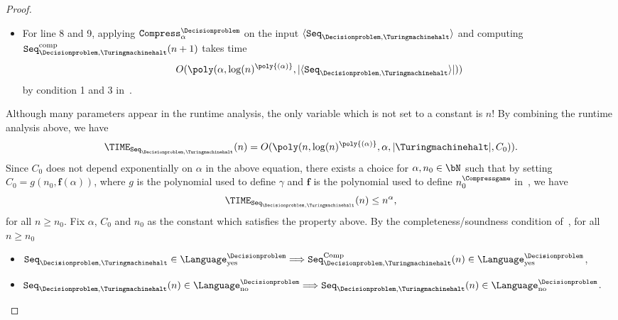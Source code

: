 \begin{proof}
\begin{itemize}
		\begin{equation*}
			O(\poly(|\cG_{C_0}|, C_0 ,n)) = O(\poly(n,C_0, |\text{\Turingmachinehalt}|)).
		\end{equation*} 
		\item For line 8 and 9, applying $\texttt{Compress}_{\alpha}^{\Decisionproblem}$ on the input $\langle \UniformseqREproof \rangle$ and computing $\texttt{Seq}_{\Decisionproblem,\text{\Turingmachinehalt}}^{\text{comp}}(n+1)$ takes time
		\begin{equation*}
			O(\poly(\alpha, \log(n)^{\poly{(\alpha)}}, |\langle \UniformseqREproof \rangle|))
		\end{equation*}
		by condition 1 and 3 in~.
	\end{itemize}
	Although many parameters appear in the runtime analysis, the only variable which is not set to a constant is $n$! By combining the runtime analysis above, we have
	\begin{equation*}
		\TIME_{\UniformseqREproof}(n) = O(\poly(n, \log(n)^{\poly{(\alpha)}}, \alpha, |\text{\Turingmachinehalt}|, C_0 )).
	\end{equation*}
	Since $C_0$ does not depend exponentially on $\alpha$ in the above equation, there exists a choice for $\alpha, n_0 \in \bN$ such that by setting $C_0 = g(n_0, \textbf{f}(\alpha))$, where $g$ is the polynomial used to define $\gamma$ and $\textbf{f}$ is the polynomial used to define $n_0^{\Compressgame}$ in~, we have
	\begin{equation*}
		\TIME_{\UniformseqREproof}(n) \leq n^{\alpha},
	\end{equation*}
	for all $n \geq n_0$. Fix $\alpha$, $C_0$ and $n_0$ as the constant which satisfies the property above. By the completeness/soundness condition of~, for all $n \geq n_0$
	\begin{itemize}
		\item  $\UniformseqREproof \in\Language_{\text{yes}}^{\Decisionproblem} \Longrightarrow \UniformseqREproof^{\text{Comp}}(n) \in\Language_{\text{yes}}^{\Decisionproblem}$, 
		\item $\UniformseqREproof(n) \in\Language_{\text{no}}^{\Decisionproblem} \Longrightarrow \UniformseqREproof(n) \in\Language_{\text{no}}^{\Decisionproblem}$.
	\end{itemize}
	

\end{proof}
